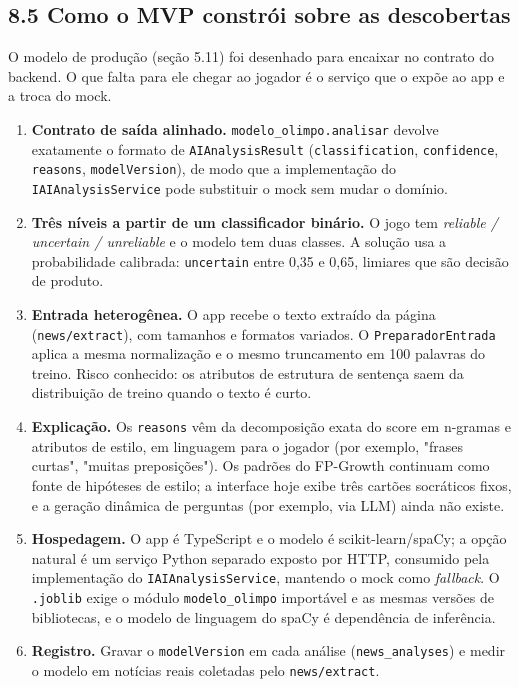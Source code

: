 \documentclass[
  brazilian,
  11pt,
]{article}
\providecommand{\tightlist}{%
  \setlength{\itemsep}{0pt}\setlength{\parskip}{0pt}}
\begin{document}
\subsection{8.5 Como o MVP constrói sobre as descobertas}\label{como-o-mvp-construxf3i-sobre-as-descobertas}

O modelo de produção (seção 5.11) foi desenhado para encaixar no contrato do backend. O que falta para ele chegar ao jogador é o serviço que o expõe ao app e a troca do mock.

\begin{enumerate}
\def\labelenumi{\arabic{enumi}.}
\tightlist
\item
  \textbf{Contrato de saída alinhado.} \texttt{modelo\_olimpo.analisar} devolve exatamente o formato de \texttt{AIAnalysisResult} (\texttt{classification}, \texttt{confidence}, \texttt{reasons}, \texttt{modelVersion}), de modo que a implementação do \texttt{IAIAnalysisService} pode substituir o mock sem mudar o domínio.
\item
  \textbf{Três níveis a partir de um classificador binário.} O jogo tem \emph{reliable / uncertain / unreliable} e o modelo tem duas classes. A solução usa a probabilidade calibrada: \texttt{uncertain} entre 0,35 e 0,65, limiares que são decisão de produto.
\item
  \textbf{Entrada heterogênea.} O app recebe o texto extraído da página (\texttt{news/extract}), com tamanhos e formatos variados. O \texttt{PreparadorEntrada} aplica a mesma normalização e o mesmo truncamento em 100 palavras do treino. Risco conhecido: os atributos de estrutura de sentença saem da distribuição de treino quando o texto é curto.
\item
  \textbf{Explicação.} Os \texttt{reasons} vêm da decomposição exata do score em n-gramas e atributos de estilo, em linguagem para o jogador (por exemplo, "frases curtas", "muitas preposições"). Os padrões do FP-Growth continuam como fonte de hipóteses de estilo; a interface hoje exibe três cartões socráticos fixos, e a geração dinâmica de perguntas (por exemplo, via LLM) ainda não existe.
\item
  \textbf{Hospedagem.} O app é TypeScript e o modelo é scikit-learn/spaCy; a opção natural é um serviço Python separado exposto por HTTP, consumido pela implementação do \texttt{IAIAnalysisService}, mantendo o mock como \emph{fallback}. O \texttt{.joblib} exige o módulo \texttt{modelo\_olimpo} importável e as mesmas versões de bibliotecas, e o modelo de linguagem do spaCy é dependência de inferência.
\item
  \textbf{Registro.} Gravar o \texttt{modelVersion} em cada análise (\texttt{news\_analyses}) e medir o modelo em notícias reais coletadas pelo \texttt{news/extract}.
\end{enumerate}
\end{document}
